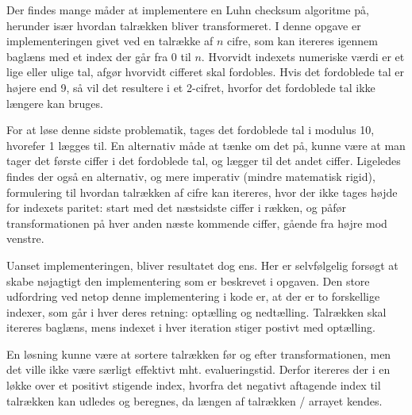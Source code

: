 Der findes mange måder at implementere en Luhn checksum algoritme på, herunder især hvordan talrækken bliver transformeret. I denne opgave er implementeringen givet ved en talrække af \(n\) cifre, som kan itereres igennem baglæns med et index der går fra 0 til \(n\). Hvorvidt indexets numeriske værdi er et lige eller ulige tal, afgør hvorvidt cifferet skal fordobles. Hvis det fordoblede tal er højere end 9, så vil det resultere i et 2-cifret, hvorfor det fordoblede tal ikke længere kan bruges.

For at løse denne sidste problematik, tages det fordoblede tal i modulus 10, hvorefer 1 lægges til. En alternativ måde at tænke om det på, kunne være at man tager det første ciffer i det fordoblede tal, og lægger til det andet ciffer. Ligeledes findes der også en alternativ, og mere imperativ (mindre matematisk rigid), formulering til hvordan talrækken af cifre kan itereres, hvor der ikke tages højde for indexets paritet: start med det næstsidste ciffer i rækken, og påfør transformationen på hver anden næste kommende ciffer, gående fra højre mod venstre.

Uanset implementeringen, bliver resultatet dog ens. Her er selvfølgelig forsøgt at skabe nøjagtigt den implementering som er beskrevet i opgaven. Den store udfordring ved netop denne implementering i kode er, at der er to forskellige indexer, som går i hver deres retning: optælling og nedtælling. Talrækken skal itereres baglæns, mens indexet i hver iteration stiger postivt med optælling.

En løsning kunne være at sortere talrækken før og efter transformationen, men det ville ikke være særligt effektivt mht. evalueringstid. Derfor itereres der i en løkke over et positivt stigende index, hvorfra det negativt aftagende index til talrækken kan udledes og beregnes, da længen af talrækken / arrayet kendes. 
